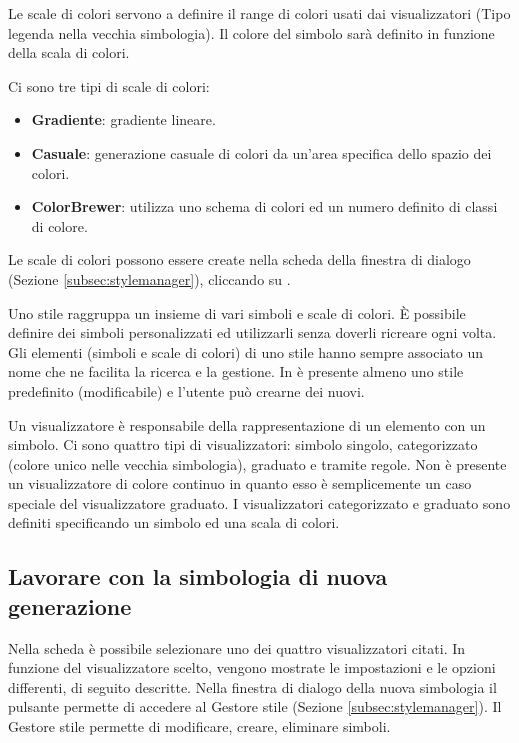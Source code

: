 
Le scale di colori servono a definire il range di colori usati dai visualizzatori (Tipo legenda nella vecchia simbologia).
Il colore del simbolo sarà definito in funzione della scala di colori.

Ci sono tre tipi di scale di colori:

\begin{itemize}[label=--]
\item \textbf{Gradiente}: gradiente lineare.
\item \textbf{Casuale}: generazione casuale di colori da un'area specifica dello spazio dei colori.
\item \textbf{ColorBrewer}: utilizza uno schema di colori ed un numero definito di classi di colore.
\end{itemize}

Le scale di colori possono essere create nella scheda  della finestra di dialogo  
(Sezione \ref{subsec:stylemanager}), cliccando su .


Uno stile raggruppa un insieme di vari simboli e scale di colori. È possibile 
definire dei simboli personalizzati ed utilizzarli senza doverli ricreare ogni volta. 
Gli elementi (simboli e scale di colori) di uno stile hanno sempre associato un nome 
che ne facilita la ricerca e la gestione. 
In \qg è presente almeno uno stile predefinito (modificabile) e l'utente può crearne dei nuovi.


Un visualizzatore è responsabile della rappresentazione di un elemento con un simbolo. 
Ci sono quattro tipi di visualizzatori: simbolo singolo, categorizzato 
(colore unico nelle vecchia simbologia), graduato e tramite regole. Non è presente 
un visualizzatore di colore continuo in quanto esso è semplicemente un caso speciale 
del visualizzatore graduato. I visualizzatori categorizzato e graduato sono definiti 
specificando un simbolo ed una scala di colori.

\subsection{Lavorare con la simbologia di nuova generazione}\label{new_generation_sym}

Nella scheda  è possibile selezionare uno dei quattro visualizzatori citati. 
In funzione del visualizzatore scelto, vengono mostrate le impostazioni e le opzioni differenti, 
di seguito descritte.
Nella finestra di dialogo della nuova simbologia il pulsante  
permette di accedere al Gestore stile (Sezione \ref{subsec:stylemanager}). Il Gestore stile permette 
di modificare, creare, eliminare simboli. 

